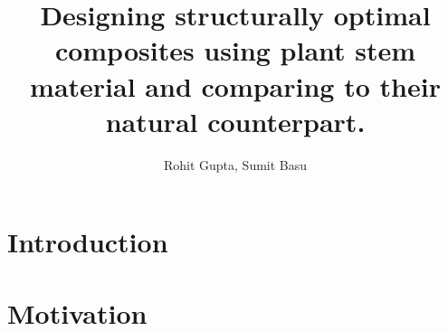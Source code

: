 \documentclass[10pt]{article}
\begin{document}
\title{Designing structurally optimal composites using plant stem material and comparing to their natural counterpart. }
\author{Rohit Gupta, Sumit Basu}

\maketitle

\tableofcontents
\newpage
\listoffigures

\newpage
\section{Introduction}

\newpage
\section{Motivation}
\newpage
\end{document}
